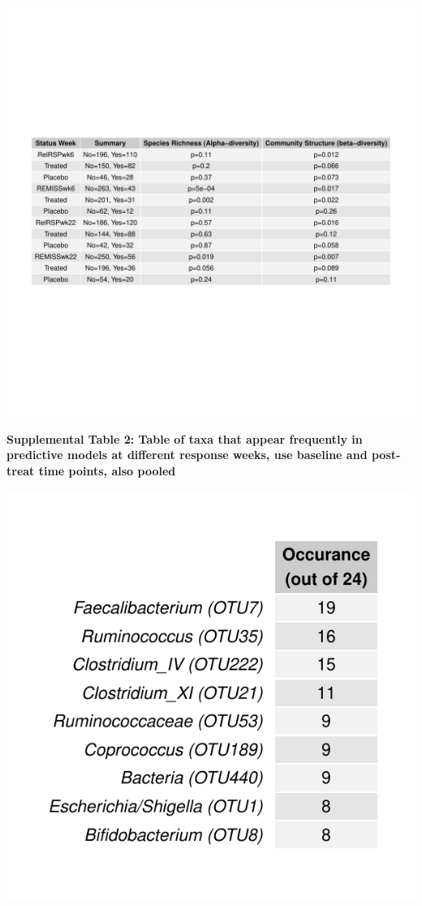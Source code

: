 \documentclass[11pt,]{article}
\begin{document}
\includegraphics{tables/table2diversity.pdf}

\newpage

\textbf{Supplemental Table 2: Table of taxa that appear frequently in
predictive models at different response weeks, use baseline and
post-treat time points, also pooled}

\includegraphics{tables/ST2_freqOTUs.pdf}
\end{document}
